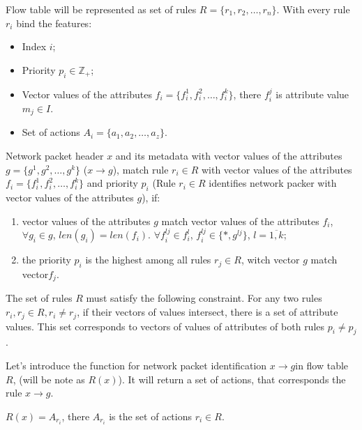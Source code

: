 \documentclass[conference]{IEEEtran}
\begin{document}
        Flow table will be represented as set of rules \(R=\{r_1,r_2,\ldots,r_n\}\). With every rule \(r_i\) bind the features:
        \begin{itemize}
            \item Index \(i\);
            \item Priority \(p_i \in \mathbb{Z}_+\);
            \item Vector values of the attributes \(f_i=\{f_i^1,f_i^2,\ldots,f_i^k\}\), there \(f_i^j\) is attribute value \(m_j\in I\). %
            \item Set of actions \(A_i = \{a_1, a_2, \ldots, a_z\} \).
        \end{itemize}

        Network packet header \(x\) and its metadata with vector values of the attributes \(g=\{g^1,g^2,\ldots,g^k\}\) (\(x \rightarrow g\)),
        match rule \(r_i\in R\) with vector values of the attributes \(f_i=\{f_i^1,f_i^2,\ldots,f_i^k\}\) 
        and priority \(p_i\) (Rule \(r_i\in R\) identifies network packer with vector values of the attributes \(g\)), if:

        \begin{enumerate}
            \item vector values of the attributes \(g\) match vector values of the attributes \(f_i\), 
                \(\forall g_i \in g\), \(len(g_i) = len(f_i)\). \(\forall f_i^{lj} \in f_i^l\), \(f_i^{lj} \in \{*, g^{lj}\}\), \(l=\overline{1,k}\);
            \item the priority \(p_i\) is the highest among all rules \(r_j\in R\), witch vector \(g\) match vector\(f_j\).
        \end{enumerate}

        The set of rules \(R\) must satisfy the following constraint. 
        For any two rules \(r_i,r_j\in R,r_i\not= r_j\),  if their vectors of values intersect, there is a set of attribute values. 
        This set corresponds to vectors of values of attributes of both rules  \(p_i\not= p_j\). 
        
        Let's introduce the function for network packet identification \(x \rightarrow g\)in flow table \(R\), (will be note as \(R(x)\)).
        It will return a set of actions, that corresponds the rule \(x \rightarrow g\). 
        \begin{center}
            \(R(x) = A_{r_i}\), there \(A_{r_i}\) is the set of actions \(r_i \in R\).
        \end{center}
\end{document}
